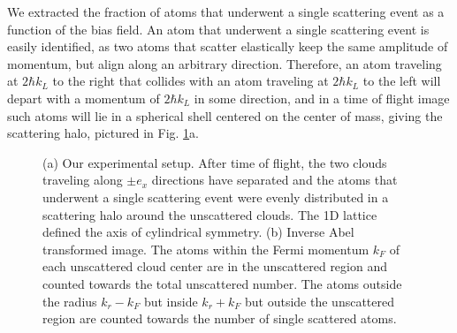 \documentclass[12pt]{iopart}
\begin{document}
\par We extracted the fraction of atoms that underwent a single scattering event as a function of the bias field. An atom that underwent a single scattering event is easily identified, as two atoms that scatter elastically keep the same amplitude of momentum, but align along an arbitrary direction. Therefore, an atom traveling at $2 \hbar k_L$ to the right that collides with an atom traveling at $2 \hbar k_L$ to the left will depart with a momentum of $2 \hbar k_L$ in some direction, and in a time of flight image such atoms will lie in a spherical shell centered on the center of mass, giving the scattering halo, pictured in Fig. \ref{fig:halo}a. 
\begin{figure}
\caption{(a) Our experimental setup. After time of flight, the two clouds traveling along $\pm e_x$ directions have separated and the atoms that underwent a single scattering event were evenly distributed in a scattering halo around the unscattered clouds. The 1D lattice defined the axis of cylindrical symmetry. (b) Inverse Abel transformed image. The atoms within the Fermi momentum $k_F$ of each unscattered cloud center are in the unscattered region and counted towards the total unscattered number. The atoms outside the radius $k_r-k_F$ but inside $k_r+k_F$ but outside the unscattered region are counted towards the number of single scattered atoms.   }  
\label{fig:halo}
\end{figure}
\end{document}
